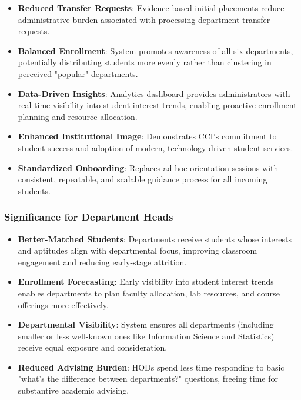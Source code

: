 \documentclass[12pt, a4paper]{article}
\begin{document}
\begin{itemize}[leftmargin=1.5em, itemsep=3pt]
    \item \textbf{Reduced Transfer Requests}: Evidence-based initial placements reduce administrative burden associated with processing department transfer requests.
    
    \item \textbf{Balanced Enrollment}: System promotes awareness of all six departments, potentially distributing students more evenly rather than clustering in perceived "popular" departments.
    
    \item \textbf{Data-Driven Insights}: Analytics dashboard provides administrators with real-time visibility into student interest trends, enabling proactive enrollment planning and resource allocation.
    
    \item \textbf{Enhanced Institutional Image}: Demonstrates CCI's commitment to student success and adoption of modern, technology-driven student services.
    
    \item \textbf{Standardized Onboarding}: Replaces ad-hoc orientation sessions with consistent, repeatable, and scalable guidance process for all incoming students.
\end{itemize}

\subsubsection*{Significance for Department Heads}

\begin{itemize}[leftmargin=1.5em, itemsep=3pt]
    \item \textbf{Better-Matched Students}: Departments receive students whose interests and aptitudes align with departmental focus, improving classroom engagement and reducing early-stage attrition.
    
    \item \textbf{Enrollment Forecasting}: Early visibility into student interest trends enables departments to plan faculty allocation, lab resources, and course offerings more effectively.
    
    \item \textbf{Departmental Visibility}: System ensures all departments (including smaller or less well-known ones like Information Science and Statistics) receive equal exposure and consideration.
    
    \item \textbf{Reduced Advising Burden}: HODs spend less time responding to basic "what's the difference between departments?" questions, freeing time for substantive academic advising.
\end{itemize}
\end{document}

